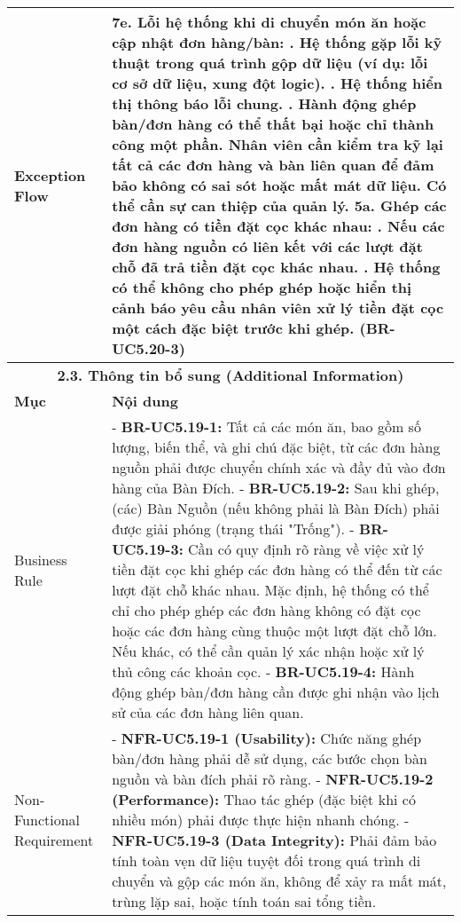 \begin{longtable}{|m{4cm}|p{11cm}|}
\hline
Exception Flow & \textbf{7e. Lỗi hệ thống khi di chuyển món ăn hoặc cập nhật đơn hàng/bàn:} \newline    1. Hệ thống gặp lỗi kỹ thuật trong quá trình gộp dữ liệu (ví dụ: lỗi cơ sở dữ liệu, xung đột logic). \newline    2. Hệ thống hiển thị thông báo lỗi chung. \newline    3. Hành động ghép bàn/đơn hàng có thể thất bại hoặc chỉ thành công một phần. Nhân viên cần kiểm tra kỹ lại tất cả các đơn hàng và bàn liên quan để đảm bảo không có sai sót hoặc mất mát dữ liệu. Có thể cần sự can thiệp của quản lý. \newline \textbf{5a. Ghép các đơn hàng có tiền đặt cọc khác nhau:} \newline    1. Nếu các đơn hàng nguồn có liên kết với các lượt đặt chỗ đã trả tiền đặt cọc khác nhau. \newline    2. Hệ thống có thể không cho phép ghép hoặc hiển thị cảnh báo yêu cầu nhân viên xử lý tiền đặt cọc một cách đặc biệt trước khi ghép. (BR-UC5.20-3) \\
\hline
\multicolumn{2}{|c|}{\textbf{2.3. Thông tin bổ sung (Additional Information)}} \\
\hline
\textbf{Mục} & \textbf{Nội dung} \\
\hline
Business Rule & - \textbf{BR-UC5.19-1:} Tất cả các món ăn, bao gồm số lượng, biến thể, và ghi chú đặc biệt, từ các đơn hàng nguồn phải được chuyển chính xác và đầy đủ vào đơn hàng của Bàn Đích. \newline - \textbf{BR-UC5.19-2:} Sau khi ghép, (các) Bàn Nguồn (nếu không phải là Bàn Đích) phải được giải phóng (trạng thái "Trống"). \newline - \textbf{BR-UC5.19-3:} Cần có quy định rõ ràng về việc xử lý tiền đặt cọc khi ghép các đơn hàng có thể đến từ các lượt đặt chỗ khác nhau. Mặc định, hệ thống có thể chỉ cho phép ghép các đơn hàng không có đặt cọc hoặc các đơn hàng cùng thuộc một lượt đặt chỗ lớn. Nếu khác, có thể cần quản lý xác nhận hoặc xử lý thủ công các khoản cọc. \newline - \textbf{BR-UC5.19-4:} Hành động ghép bàn/đơn hàng cần được ghi nhận vào lịch sử của các đơn hàng liên quan. \\
\hline
Non-Functional Requirement & - \textbf{NFR-UC5.19-1 (Usability):} Chức năng ghép bàn/đơn hàng phải dễ sử dụng, các bước chọn bàn nguồn và bàn đích phải rõ ràng. \newline - \textbf{NFR-UC5.19-2 (Performance):} Thao tác ghép (đặc biệt khi có nhiều món) phải được thực hiện nhanh chóng. \newline - \textbf{NFR-UC5.19-3 (Data Integrity):} Phải đảm bảo tính toàn vẹn dữ liệu tuyệt đối trong quá trình di chuyển và gộp các món ăn, không để xảy ra mất mát, trùng lặp sai, hoặc tính toán sai tổng tiền. \\
\hline
\end{longtable}

